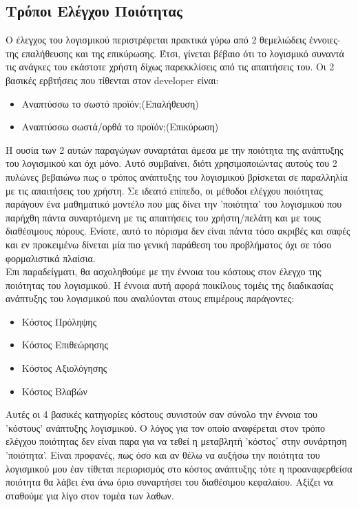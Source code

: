\documentclass{article}
\begin{document}
{{\subsection{Tρόποι Ελέγχου Ποιότητας}%
Ο έλεγχος του λογισμικού περιστρέφεται πρακτικά γύρω από 2 θεμελιώδεις έννοιες-της επαλήθευσης και της επικύρωσης. Έτσι, γίνεται βέβαιο ότι το λογισμικό συναντά τις ανάγκες του εκάστοτε χρήστη δίχως παρεκκλίσεις από τις απαιτήσεις του. Οι 2 βασικές ερβτήσεις που τίθενται στον \textlatin{developer} είναι:
\begin{itemize}
\item Αναπτύσσω το σωστό προϊόν\textlatin{;}(Επαλήθευση)
\item Αναπτύσσω σωστά/ορθά το προϊόν\textlatin{;}(Επικύρωση)
\end{itemize}
H ουσία των 2 αυτών παραγώγων συναρτάται άμεσα με την ποιότητα της ανάπτυξης του λογισμικού και όχι μόνο. Αυτό συμβαίνει, διότι χρησιμοποιώντας αυτούς του 2 πυλώνες βεβαιώνω πως ο τρόπος ανάπτυξης του λογισμικού βρίσκεται σε παραλληλία με τις απαιτήσεις του χρήστη. Σε ιδεατό επίπεδο, οι μέθοδοι ελέγχου ποιότητας παράγουν ένα μαθηματικό μοντέλο που μας δίνει την 'ποιότητα' του λογισμικού που παρήχθη πάντα συναρτόμενη με τις απαιτήσεις του χρήστη/πελάτη και με τους διαθέσιμους πόρους. Ενίοτε, αυτό το πόρισμα δεν είναι πάντα τόσο ακριβές και σαφές και εν προκειμένω δίνεται μία πιο γενική παράθεση του προβλήματος όχι σε τόσο φορμαλιστικά πλαίσια. \\
Επι παραδείγματι, θα ασχοληθούμε με την έννοια του κόστους στον έλεγχο της ποιότητας του λογισμικού. Η έννοια αυτή αφορά ποικίλους τομέις της διαδικασίας ανάπτυξης του λογισμικού που αναλύονται στους επιμέρους παράγοντες:
\begin{itemize}
\item Kόστος Πρόληψης 
\item Κόστος Επιθεώρησης
\item Κόστος Αξιολόγησης
\item Κόστος Βλαβών
\end{itemize}
Αυτές οι 4 βασικές κατηγορίες κόστους συνιστούν σαν σύνολο την έννοια του 'κόστους' ανάπτυξης λογισμικού. Ο λόγος για τον οποίο αναφέρεται στον τρόπο ελέγχου ποιότητας δεν είναι παρα για να τεθεί η μεταβλητή 'κόστος΄ στην συνάρτηση 'ποιότητα'.
Είναι προφανές, πως όσο και αν θέλω να αυξήσω την ποιότητα του λογισμικού μου έαν τίθεται περιορισμός στο κόστος ανάπτυξης τότε η προαναφερθείσα ποιότητα θα λάβει ένα άνω όριο συναρτήσει του διαθέσιμου κεφαλαίου. Αξίζει να σταθούμε για λίγο στον τομέα των λαθων.


}}
\end{document}

